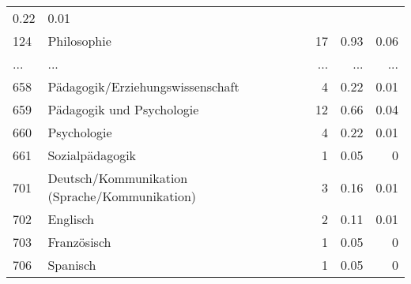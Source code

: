 \begin{longtable}{lXrrr}
          \num[round-mode=places,round-precision=2]{0,22} &
          \num[round-mode=places,round-precision=2]{0,01} \\
        124 & \multicolumn{1}{X}{Philosophie} & %
          \num{17} &
          \num[round-mode=places,round-precision=2]{0,93} &
          \num[round-mode=places,round-precision=2]{0,06} \\
       ... & ... & ... & ... & ... \\
        658 & \multicolumn{1}{X}{Pädagogik/Erziehungswissenschaft} & %
          \num{4} &
          \num[round-mode=places,round-precision=2]{0,22} &
          \num[round-mode=places,round-precision=2]{0,01} \\

        659 & \multicolumn{1}{X}{Pädagogik und Psychologie} & %
          \num{12} &
          \num[round-mode=places,round-precision=2]{0,66} &
          \num[round-mode=places,round-precision=2]{0,04} \\

        660 & \multicolumn{1}{X}{Psychologie} & %
          \num{4} &
          \num[round-mode=places,round-precision=2]{0,22} &
          \num[round-mode=places,round-precision=2]{0,01} \\

        661 & \multicolumn{1}{X}{Sozialpädagogik} & %
          \num{1} &
          \num[round-mode=places,round-precision=2]{0,05} &
          \num[round-mode=places,round-precision=2]{0} \\

        701 & \multicolumn{1}{X}{Deutsch/Kommunikation (Sprache/Kommunikation)} & %
          \num{3} &
          \num[round-mode=places,round-precision=2]{0,16} &
          \num[round-mode=places,round-precision=2]{0,01} \\

        702 & \multicolumn{1}{X}{Englisch} & %
          \num{2} &
          \num[round-mode=places,round-precision=2]{0,11} &
          \num[round-mode=places,round-precision=2]{0,01} \\

        703 & \multicolumn{1}{X}{Französisch} & %
          \num{1} &
          \num[round-mode=places,round-precision=2]{0,05} &
          \num[round-mode=places,round-precision=2]{0} \\

        706 & \multicolumn{1}{X}{Spanisch} & %
          \num{1} &
          \num[round-mode=places,round-precision=2]{0,05} &
          \num[round-mode=places,round-precision=2]{0} \\


\end{longtable}
